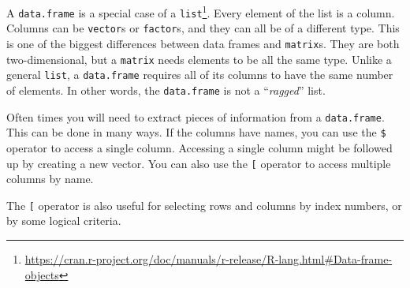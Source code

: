 \documentclass[
  12pt,
  krantz2]{krantz}
\makeatletter
\newenvironment{Shaded}{\begin{snugshade}}{\end{snugshade}}
\newcommand{\DecValTok}[1]{\textcolor[rgb]{0.06,0.06,0.06}{#1}}
\newcommand{\DocumentationTok}[1]{\textcolor[rgb]{0.37,0.37,0.37}{\textbf{\textit{#1}}}}
\newcommand{\FunctionTok}[1]{\textcolor[rgb]{0,0,0}{#1}}
\newcommand{\NormalTok}[1]{#1}
\newcommand{\OtherTok}[1]{\textcolor[rgb]{0.37,0.37,0.37}{#1}}
\newcommand{\SpecialCharTok}[1]{\textcolor[rgb]{0,0,0}{#1}}
\newcommand{\StringTok}[1]{\textcolor[rgb]{0.5,0.5,0.5}{#1}}
\renewcommand{\href}[2]{#2\footnote{\url{#1}}}
\newenvironment{kframe}{%
\medskip{}
\setlength{\fboxsep}{.8em}
 \def\at@end@of@kframe{}%
 \ifinner\ifhmode%
  \def\at@end@of@kframe{\end{minipage}}%
  \begin{minipage}{\columnwidth}%
 \fi\fi%
 \def\FrameCommand##1{\hskip\@totalleftmargin \hskip-\fboxsep
 \colorbox{shadecolor}{##1}\hskip-\fboxsep
     \hskip-\linewidth \hskip-\@totalleftmargin \hskip\columnwidth}%
 \MakeFramed {\advance\hsize-\width
   \@totalleftmargin\z@ \linewidth\hsize
   \@setminipage}}%
 {\par\unskip\endMakeFramed%
 \at@end@of@kframe}
\renewenvironment{Shaded}{\begin{kframe}}{\end{kframe}}
\makeatother
\begin{document}
\href{https://cran.r-project.org/doc/manuals/r-release/R-lang.html\#Data-frame-objects}{A \texttt{data.frame} is a special case of a \texttt{list}}. Every element of the list is a column. Columns can be \texttt{vector}s or \texttt{factor}s, and they can all be of a different type. This is one of the biggest differences between data frames and \texttt{matrix}s. They are both two-dimensional, but a \texttt{matrix} needs elements to be all the same type. Unlike a general \texttt{list}, a \texttt{data.frame} requires all of its columns to have the same number of elements. In other words, the \texttt{data.frame} is not a ``\emph{ragged}'' list.

Often times you will need to extract pieces of information from a \texttt{data.frame}. This can be done in many ways. If the columns have names, you can use the \texttt{\$} operator to access a single column. Accessing a single column might be followed up by creating a new vector. You can also use the \texttt{{[}} operator to access multiple columns by name.

\begin{Shaded}
\end{Shaded}

The \texttt{{[}} operator is also useful for selecting rows and columns by index numbers, or by some logical criteria.
\end{document}
